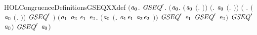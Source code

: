 \begin{SaveVerbatim}{HOLCongruenceDefinitionsGSEQXXdef}
\HOLTokenTurnstile{}  \HOLSymConst{\ensuremath{=}}
   \ensuremath{(}\HOLTokenLambda{}\ensuremath{\HOLBoundVar{a}\sb{\mathrm{0}}}.
        \HOLSymConst{\HOLTokenForall{}}\ensuremath{\HOLBoundVar{GSEQ}\sp{\prime}}.
            \ensuremath{(}\HOLSymConst{\HOLTokenForall{}}\ensuremath{\HOLBoundVar{a}\sb{\mathrm{0}}}.
                 \ensuremath{(}\ensuremath{\HOLBoundVar{a}\sb{\mathrm{0}}} \HOLSymConst{\ensuremath{=}} \ensuremath{(}\HOLTokenLambda{}. \ensuremath{)}\ensuremath{)} \HOLSymConst{\HOLTokenDisj{}} \ensuremath{(}\HOLSymConst{\HOLTokenExists{}}. \ensuremath{\HOLBoundVar{a}\sb{\mathrm{0}}} \HOLSymConst{\ensuremath{=}} \ensuremath{(}\HOLTokenLambda{}. \ensuremath{)}\ensuremath{)} \HOLSymConst{\HOLTokenDisj{}}
                 \ensuremath{(}\HOLSymConst{\HOLTokenExists{}} . \ensuremath{(}\ensuremath{\HOLBoundVar{a}\sb{\mathrm{0}}} \HOLSymConst{\ensuremath{=}} \ensuremath{(}\HOLTokenLambda{}. \HOLSymConst{\ensuremath{\ldotp}} \ensuremath{)}\ensuremath{)} \HOLSymConst{\HOLTokenConj{}} \ensuremath{\HOLBoundVar{GSEQ}\sp{\prime}} \ensuremath{)} \HOLSymConst{\HOLTokenDisj{}}
                 \ensuremath{(}\HOLSymConst{\HOLTokenExists{}}\ensuremath{\HOLBoundVar{a}\sb{\mathrm{1}}} \ensuremath{\HOLBoundVar{a}\sb{\mathrm{2}}} \ensuremath{\HOLBoundVar{e}\sb{\mathrm{1}}} \ensuremath{\HOLBoundVar{e}\sb{\mathrm{2}}}.
                      \ensuremath{(}\ensuremath{\HOLBoundVar{a}\sb{\mathrm{0}}} \HOLSymConst{\ensuremath{=}} \ensuremath{(}\HOLTokenLambda{}. \ensuremath{\HOLBoundVar{a}\sb{\mathrm{1}}}\HOLSymConst{\ensuremath{\ldotp}}\ensuremath{\HOLBoundVar{e}\sb{\mathrm{1}}}  \HOLSymConst{\ensuremath{+}} \ensuremath{\HOLBoundVar{a}\sb{\mathrm{2}}}\HOLSymConst{\ensuremath{\ldotp}}\ensuremath{\HOLBoundVar{e}\sb{\mathrm{2}}} \ensuremath{)}\ensuremath{)} \HOLSymConst{\HOLTokenConj{}}
                      \ensuremath{\HOLBoundVar{GSEQ}\sp{\prime}} \ensuremath{\HOLBoundVar{e}\sb{\mathrm{1}}} \HOLSymConst{\HOLTokenConj{}} \ensuremath{\HOLBoundVar{GSEQ}\sp{\prime}} \ensuremath{\HOLBoundVar{e}\sb{\mathrm{2}}}\ensuremath{)} \HOLSymConst{\HOLTokenImp{}}
                 \ensuremath{\HOLBoundVar{GSEQ}\sp{\prime}} \ensuremath{\HOLBoundVar{a}\sb{\mathrm{0}}}\ensuremath{)} \HOLSymConst{\HOLTokenImp{}}
            \ensuremath{\HOLBoundVar{GSEQ}\sp{\prime}} \ensuremath{\HOLBoundVar{a}\sb{\mathrm{0}}}\ensuremath{)}
\end{SaveVerbatim}
